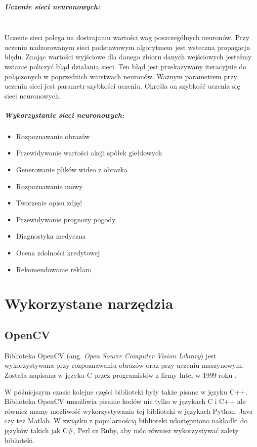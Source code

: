 \documentclass[a4paper,12pt,twoside,openany]{report}
\begin{document}
\paragraph{Uczenie sieci neuronowych:}
\mbox{} \\
\indent
Uczenie sieci polega na dostrajaniu wartości wag poszczególnych neuronów. Przy uczeniu nadzorowanym sieci podstawowym algorytmem jest wsteczna propagacja błędu. Znając wartości wyjściowe dla danego zbioru danych wejściowych jesteśmy wstanie policzyć błąd działania sieci. Ten błąd jest przekazywany iteracyjnie do połączonych w poprzednich warstwach neuronów. Ważnym parametrem przy uczeniu sieci jest parametr szybkości uczeniu. Określa on szybkość uczenia się sieci neuronowych. 

\paragraph{Wykorzystanie sieci neuronowych:}
\begin{itemize}
	\item Rozpoznawanie obrazów
	\item Przewidywanie wartości akcji spółek giełdowych
	\item Generowanie plików wideo z obrazka
	\item Rozpoznawanie mowy
	\item Tworzenie opisu zdjęć
	\item Przewidywanie prognozy pogody
	\item Diagnostyka medyczna
	\item Ocena zdolności kredytowej
	\item Rekomendowanie reklam
\end{itemize}

\chapter{Wykorzystane narzędzia}

\section{OpenCV}
Biblioteka OpenCV (ang.\textit{ Open Source Computer Vision Library}) jest wykorzystywana przy rozpoznawaniu obrazów oraz przy uczeniu maszynowym. Została napisana w języku C przez programistów z firmy Intel w 1999 roku \cite{opencv}.

W późniejszym czasie kolejne części biblioteki były także pisane w języku C++. Biblioteka OpenCV umożliwia pisanie kodów nie tylko w językach C i C++ ale również mamy możliwość wykorzystywania tej biblioteki w językach Python, Java czy też Matlab. W związku z popularnością biblioteki udostępniono nakładki do języków takich jak C\#, Perl cz Ruby, aby móc również wykorzystywać zalety  biblioteki\cite{opencv2}. 
\end{document}
